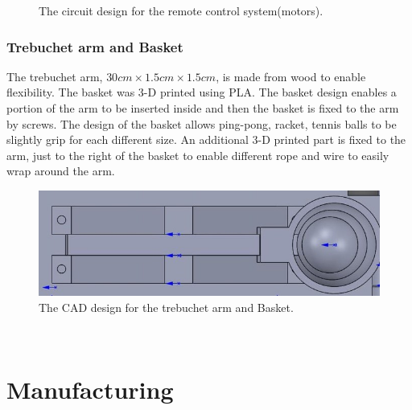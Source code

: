 \documentclass{article}
\begin{document}
\begin{figure}[H]
\centering
{}
\caption{The circuit design for the remote control system(motors).}
\end{figure}


\subsubsection*{Trebuchet arm and Basket}
The trebuchet arm, $30cm\times 1.5cm\times 1.5cm$, is made from wood to enable flexibility. The basket was 3-D printed using PLA. The basket design enables a portion of the arm to be inserted inside and then the basket is fixed to the arm by screws. The design of the basket allows ping-pong, racket, tennis balls to be slightly grip for each different size.  An additional 3-D printed part is fixed to the arm, just to the right of the basket to enable different rope and wire to easily wrap around the arm.
\begin{figure}[H]
\centering
\includegraphics[width=0.5\linewidth]{arm}
\caption{The CAD design for the trebuchet arm and Basket.}
\end{figure}
\
\
%
%
\section{Manufacturing}
\end{document}
